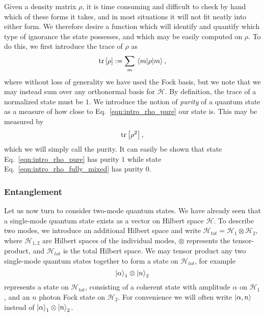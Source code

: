 Given a density matrix $\rho$, it is time consuming and difficult to check by hand which of these forms it takes, and in most situations it will not fit neatly into either form. We therefore desire a function which will identify and quantify which type of ignorance the state possesses, and which may be easily computed on $\rho$. To do this, we first introduce the trace of $\rho$ as
\begin{equation}
\tr\left[\rho\right] := \sum_m \mel{m}{\rho}{m},
\end{equation}
where without loss of generality we have used the Fock basis, but we note that we may instead sum over any orthonormal basis for $\mathcal{H}$. By definition, the trace of a normalized state must be $1$. We introduce the notion of \emph{purity} of a quantum state as a measure of how close to Eq.~\ref{eqn:intro_rho_pure} our state is. This may be measured by
\begin{equation}\label{eqn:intro_purity}
\tr\left[ \rho^2 \right],
\end{equation}
which we will simply call the purity. It can easily be shown that state Eq.~\ref{eqn:intro_rho_pure} has purity $1$ while state Eq.~\ref{eqn:intro_rho_fully_mixed} has purity $0$.

\subsubsection{Entanglement}

Let us now turn to consider two-mode quantum states. We have already seen that a single-mode quantum state exists as a vector on Hilbert space $\mathcal{H}$. To describe two modes, we introduce an additional Hilbert space and write $\mathcal{H}_{tot} = \mathcal{H}_1 \otimes \mathcal{H}_2$, where $\mathcal{H}_{1,2}$ are Hilbert spaces of the individual modes, $\otimes$ represents the tensor-product, and $\mathcal{H}_{tot}$ is the total Hilbert space. We may tensor product any two single-mode quantum states together to form a state on $\mathcal{H}_{tot}$, for example
\begin{equation}\label{eqn:intro_separable_1}
\ket{\alpha}_1 \otimes \ket{n}_2
\end{equation}
represents a state on $\mathcal{H}_{tot}$, consisting of a coherent state with amplitude $\alpha$ on $\mathcal{H}_1$, and an $n$ photon Fock state on $\mathcal{H}_2$. For convenience we will often write $\ket{\alpha, n}$ instead of $\ket{\alpha}_1 \otimes \ket{n}_2$.

